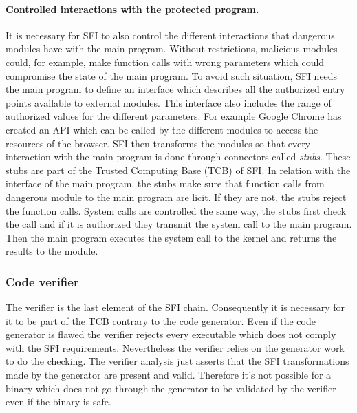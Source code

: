 \documentclass[11pt]{sdm}
\begin{document}
\paragraph{Controlled interactions with the protected program.}
\label{par:Controled interactions with the protected program}

	It is necessary for SFI to also control the different interactions that dangerous modules have with the main program. Without restrictions, malicious modules could, for example, make function calls with wrong parameters which could compromise the state of the main program. 
To avoid such situation, SFI needs the main program to define an interface which describes all the authorized entry points available to external modules. This interface also includes the range of authorized values for the different parameters. 
For example Google Chrome has created an API which can be called by the different modules to access the resources of the browser.
SFI then transforms the modules so that every interaction with the main program is done through connectors called \textit{stubs}. These stubs are part of the Trusted Computing Base (TCB) of SFI. In relation with the interface of the main program, the stubs make sure that function calls from dangerous module to the main program are licit. If they are not, the stubs reject the function calls. 
System calls are controlled the same way, the stubs first check the call and if it is authorized they transmit the system call to the main program. Then the main program executes the system call to the kernel and returns the results to the module.

\subsubsection{Code verifier}
\label{ssub:Code verifier}
The verifier is the last element of the SFI chain. Consequently it is necessary for it to be part of the TCB contrary to the code generator. Even if the code generator is flawed the verifier rejects every executable which does not comply with the SFI requirements. Nevertheless the verifier relies on the generator work to do the checking. The verifier analysis just asserts that the SFI transformations made by the generator are present and valid. Therefore it's not possible for a binary which does not go through the generator to be validated by the verifier even if the binary is safe.
\end{document}
